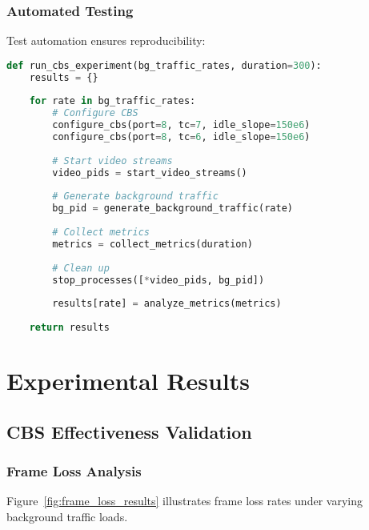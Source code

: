 \documentclass[10pt, journal, compsoc]{IEEEtran}
\begin{document}
\subsubsection{Automated Testing}

Test automation ensures reproducibility:

\begin{lstlisting}[language=python, caption=Test Automation Script]
def run_cbs_experiment(bg_traffic_rates, duration=300):
    results = {}
    
    for rate in bg_traffic_rates:
        # Configure CBS
        configure_cbs(port=8, tc=7, idle_slope=150e6)
        configure_cbs(port=8, tc=6, idle_slope=150e6)
        
        # Start video streams
        video_pids = start_video_streams()
        
        # Generate background traffic
        bg_pid = generate_background_traffic(rate)
        
        # Collect metrics
        metrics = collect_metrics(duration)
        
        # Clean up
        stop_processes([*video_pids, bg_pid])
        
        results[rate] = analyze_metrics(metrics)
    
    return results
\end{lstlisting}

\section{Experimental Results}
\label{sec:results}

\subsection{CBS Effectiveness Validation}

\subsubsection{Frame Loss Analysis}

Figure~\ref{fig:frame_loss_results} illustrates frame loss rates under varying background traffic loads.
\end{document}
